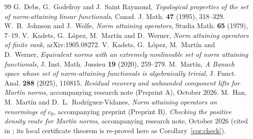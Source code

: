 \documentclass[10pt]{amsart}
\theoremstyle{definition}
\theoremstyle{remark}
\begin{document}
\begin{thebibliography}{99}
G.~Debs, G.~Godefroy and J.~Saint Raymond,
\emph{Topological properties of the set of norm-attaining linear
functionals}, Canad. J. Math. \textbf{47} (1995), 318--329.
W.~B.~Johnson and J.~Wolfe, \emph{Norm attaining operators},
Studia Math. \textbf{65} (1979), 7--19.
V.~Kadets, G.~L\'opez, M.~Mart\'in and D.~Werner,
\emph{Norm attaining operators of finite rank}, arXiv:1905.08272.
V.~Kadets, G.~L\'opez, M.~Mart\'in and D.~Werner,
\emph{Equivalent norms with an extremely nonlineable set of norm attaining
functionals}, J. Inst. Math. Jussieu \textbf{19} (2020), 259--279.
M.~Mart\'in,
\emph{A Banach space whose set of norm-attaining functionals is
algebraically trivial}, J. Funct. Anal. \textbf{288} (2025), 110815.
\emph{Residual recovery and unbounded component lifts for Mart\'in norms},
accompanying research note (Preprint A), October 2026.
M.~Han, M.~Mart\'in and D.~L.~Rodr\'iguez-Vidanes,
\emph{Norm attaining operators on renormings of $c_0$}, accompanying
preprint (Preprint B).
\emph{Checking the positive density route for Mart\'in norms},
accompanying research note, October 2026 (cited in \cite{PrA}; its local
certificate theorem is re-proved here as Corollary~\ref{cor:check}).
\end{thebibliography}
\end{document}
